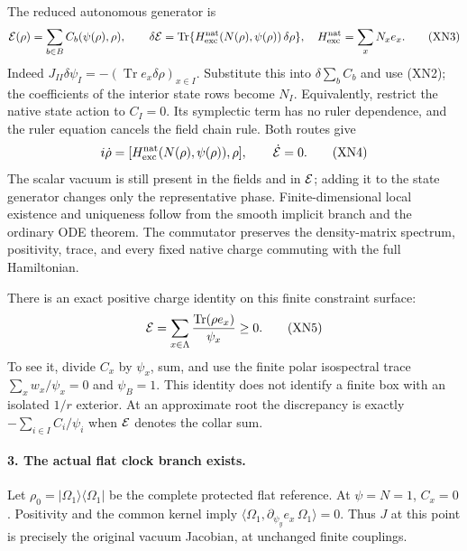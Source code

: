 \documentclass[11pt]{article}
\DeclareMathOperator{\Tr}{Tr}
\begin{document}
The reduced autonomous generator is
\begin{equation}
 {\cal E}(\rho)=\sum_{b\in B}C_b(\psi(\rho),\rho),\qquad
 \delta{\cal E}
   =\Tr\{H_{\rm exc}^{\rm nat}(N(\rho),\psi(\rho))\,\delta\rho\},
 \quad H_{\rm exc}^{\rm nat}=\sum_xN_xe_x .
 \tag{XN3}
\end{equation}
Indeed $J_{II}\delta\psi_I=-(\Tr e_x\delta\rho)_{x\in I}$.
Substitute this into $\delta\sum_b C_b$ and use (XN2); the coefficients
of the interior state rows become $N_I$.  Equivalently, restrict the
native state action to $C_I=0$.  Its symplectic term has no ruler
dependence, and the ruler equation cancels the field chain rule.
Both routes give
\begin{equation}
 i\dot\rho=[H_{\rm exc}^{\rm nat}(N(\rho),\psi(\rho)),\rho],
 \qquad \dot{\cal E}=0 .
 \tag{XN4}
\end{equation}
The scalar vacuum is still present in the fields and in ${\cal E}$;
adding it to the state generator changes only the representative phase.
Finite-dimensional local existence and uniqueness follow from the
smooth implicit branch and the ordinary ODE theorem.  The commutator
preserves the density-matrix spectrum, positivity, trace, and every
fixed native charge commuting with the full Hamiltonian.

There is an exact positive charge identity on this finite constraint
surface:
\begin{equation}
 {\cal E}=\sum_{x\in\Lambda}
       \frac{\Tr(\rho e_x)}{\psi_x}\geq0.
 \tag{XN5}
\end{equation}
To see it, divide $C_x$ by $\psi_x$, sum, and use the finite polar
isospectral trace $\sum_xw_x/\psi_x=0$ and $\psi_B=1$.
This identity does not identify a finite box with an isolated
$1/r$ exterior.  At an approximate root the discrepancy is exactly
$-\sum_{i\in I}C_i/\psi_i$ when ${\cal E}$ denotes the collar sum.

\paragraph{3. The actual flat clock branch exists.}
Let $\rho_0=|\Omega_1\rangle\langle\Omega_1|$ be the complete protected
flat reference.  At $\psi=N=1$, $C_x=0$.  Positivity and the common
kernel imply
$\langle\Omega_1,\partial_{\psi_y}e_x\,\Omega_1\rangle=0$.
Thus $J$ at this point is precisely the original vacuum Jacobian,
at unchanged finite couplings.
\end{document}
